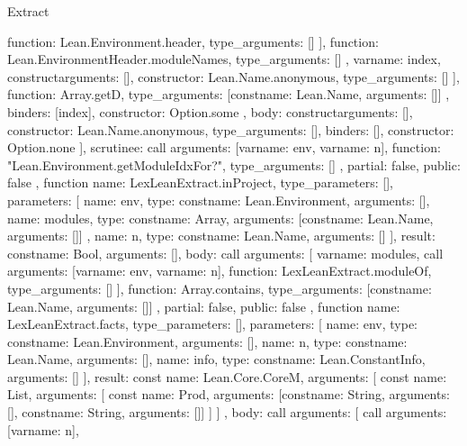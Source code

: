 \begin{lexlean}{Extract}
\begin{toolingmodule}
{{{{{{{                      function: Lean.Environment.header,
                      type_arguments: []
                    }
                  ],
                  function: Lean.EnvironmentHeader.moduleNames,
                  type_arguments: []
                },
                var{name: index},
                construct{arguments: [], constructor: Lean.Name.anonymous, type_arguments: []}
              ],
              function: Array.getD,
              type_arguments: [const{name: Lean.Name, arguments: []}]
            },
            binders: [index],
            constructor: Option.some
          },
          {
            body: construct{arguments: [], constructor: Lean.Name.anonymous, type_arguments: []},
            binders: [],
            constructor: Option.none
          }
        ],
        scrutinee: call{
          arguments: [var{name: env}, var{name: n}],
          function: "Lean.Environment.getModuleIdxFor?",
          type_arguments: []
        }
      },
      partial: false,
      public: false
    },
    function{
      name: LexLeanExtract.inProject,
      type_parameters: [],
      parameters: [
        {name: env, type: const{name: Lean.Environment, arguments: []}},
        {
          name: modules,
          type: const{name: Array, arguments: [const{name: Lean.Name, arguments: []}]}
        },
        {name: n, type: const{name: Lean.Name, arguments: []}}
      ],
      result: const{name: Bool, arguments: []},
      body: call{
        arguments: [
          var{name: modules},
          call{
            arguments: [var{name: env}, var{name: n}],
            function: LexLeanExtract.moduleOf,
            type_arguments: []
          }
        ],
        function: Array.contains,
        type_arguments: [const{name: Lean.Name, arguments: []}]
      },
      partial: false,
      public: false
    },
    function{
      name: LexLeanExtract.facts,
      type_parameters: [],
      parameters: [
        {name: env, type: const{name: Lean.Environment, arguments: []}},
        {name: n, type: const{name: Lean.Name, arguments: []}},
        {name: info, type: const{name: Lean.ConstantInfo, arguments: []}}
      ],
      result: const{
        name: Lean.Core.CoreM,
        arguments: [
          const{
            name: List,
            arguments: [
              const{
                name: Prod,
                arguments: [const{name: String, arguments: []}, const{name: String, arguments: []}]
              }
            ]
          }
        ]
      },
      body: call{
        arguments: [
          call{
            arguments: [var{name: n}],
}}}}
\end{toolingmodule}
\end{lexlean}
